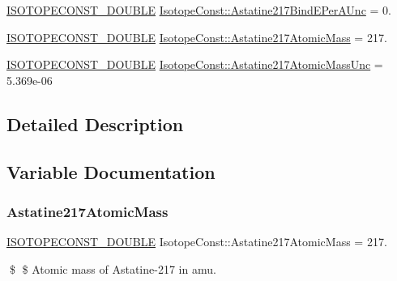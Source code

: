 \begin{DoxyCompactItemize}
\mbox{\hyperlink{group___isotope_const-_macros_ga8f45a7272ce02c0b4c65c44636ed719a}{I\+S\+O\+T\+O\+P\+E\+C\+O\+N\+S\+T\+\_\+\+D\+O\+U\+B\+LE}} \mbox{\hyperlink{group___isotope_const-_astatine-_at217_ga646d4ae86502d9a88c849e32adace59f}{Isotope\+Const\+::\+Astatine217\+Bind\+E\+Per\+A\+Unc}} = 0.
\item 
\mbox{\hyperlink{group___isotope_const-_macros_ga8f45a7272ce02c0b4c65c44636ed719a}{I\+S\+O\+T\+O\+P\+E\+C\+O\+N\+S\+T\+\_\+\+D\+O\+U\+B\+LE}} \mbox{\hyperlink{group___isotope_const-_astatine-_at217_ga8d5170e0aa920f0bca3d3e80ae864a3a}{Isotope\+Const\+::\+Astatine217\+Atomic\+Mass}} = 217.
\item 
\mbox{\hyperlink{group___isotope_const-_macros_ga8f45a7272ce02c0b4c65c44636ed719a}{I\+S\+O\+T\+O\+P\+E\+C\+O\+N\+S\+T\+\_\+\+D\+O\+U\+B\+LE}} \mbox{\hyperlink{group___isotope_const-_astatine-_at217_ga9cc3f574ac89cf2e835d9c156e81e237}{Isotope\+Const\+::\+Astatine217\+Atomic\+Mass\+Unc}} = 5.\+369e-\/06
\end{DoxyCompactItemize}


\subsection{Detailed Description}


\subsection{Variable Documentation}
\mbox{\label{group___isotope_const-_astatine-_at217_ga8d5170e0aa920f0bca3d3e80ae864a3a}} 
\subsubsection{\texorpdfstring{Astatine217\+Atomic\+Mass}{Astatine217AtomicMass}}
{\footnotesize\ttfamily \mbox{\hyperlink{group___isotope_const-_macros_ga8f45a7272ce02c0b4c65c44636ed719a}{I\+S\+O\+T\+O\+P\+E\+C\+O\+N\+S\+T\+\_\+\+D\+O\+U\+B\+LE}} Isotope\+Const\+::\+Astatine217\+Atomic\+Mass = 217.}

\$ \$ Atomic mass of Astatine-\/217 in amu. \mbox{\label{group___isotope_const-_astatine-_at217_ga9cc3f574ac89cf2e835d9c156e81e237}} 
